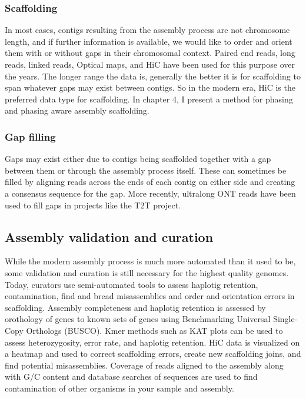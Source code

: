 \subsubsection{Scaffolding}

\par{
In most cases, contigs resulting from the assembly process are not chromosome length, and if further information is available, we would like to order and orient them with or without gaps in their chromosomal context. Paired end reads, long reads, linked reads, Optical maps, and HiC have been used for this purpose over the years\cite{scaffoldingreview}\cite{scaff10x}\cite{SALSA}. The longer range the data is, generally the better it is for scaffolding to span whatever gaps may exist between contigs. So in the modern era, HiC is the preferred data type for scaffolding. In chapter 4, I present a method for phasing and phasing aware assembly scaffolding.
}
\subsubsection{Gap filling}

\par{
Gaps may exist either due to contigs being scaffolded together with a gap between them or through the assembly process itself. These can sometimes be filled by aligning reads across the ends of each contig on either side and creating a consensus sequence for the gap\cite{pbjelly}. More recently, ultralong ONT reads have been used to fill gaps in projects like the T2T project\cite{ultralong1}\cite{ultralong2}.
}

\subsection{Assembly validation and curation}

\par{
While the modern assembly process is much more automated than it used to be, some validation and curation is still necessary for the highest quality genomes. Today, curators use semi-automated tools to assess haplotig retention, contamination, find and bread misassemblies and order and orientation errors in scaffolding\cite{curation2}. Assembly completeness and haplotig retention is assessed by orothology of genes to known sets of genes using Benchmarking Universal Single-Copy Orthologs (BUSCO)\cite{BUSCO}. Kmer methods such as KAT plots\cite{KAT} can be used to assess heterozygosity, error rate, and haplotig retention. HiC data is visualized on a heatmap and used to correct scaffolding errors, create new scaffolding joins, and find potential misassemblies\cite{juicer}\cite{higlass}\cite{juicebox}. Coverage of reads aligned to the assembly along with G/C content and database searches of sequences are used to find contamination of other organisms in your sample and assembly\cite{blobtools}\cite{blobtoolkit}.
}

